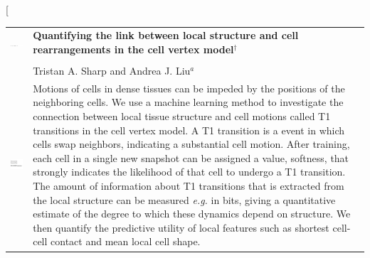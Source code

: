 \documentclass[twoside,twocolumn,9pt]{article}
\begin{document}
\twocolumn[
  \begin{@twocolumnfalse}
\vspace{3cm}
\sffamily
\begin{tabular}{m{4.5cm} p{13.5cm} }

\includegraphics{head_foot/DOI} & \noindent\LARGE{\textbf{
Quantifying the link between local structure and cell rearrangements in the cell vertex model$^\dag$}} \\
\vspace{0.3cm} & \vspace{0.3cm} \\

 & \noindent\large{Tristan A. Sharp and Andrea J. Liu\textit{$^{a}$}} \\%

\includegraphics{head_foot/dates} & \noindent\normalsize{


Motions of cells in dense tissues can be impeded by the positions of the neighboring cells.
We use a machine learning method to investigate 
the connection between local tissue structure and cell motions called T1 transitions in the cell vertex model.
A T1 transition is a event in which cells swap neighbors, indicating a substantial cell motion.
After training, each cell in a single new snapshot can be assigned a value, softness, that strongly indicates the 
likelihood of that cell to undergo a T1 transition.
The amount of information about T1 transitions that is extracted from the local structure can be measured \emph{e.g.} in bits, giving a quantitative estimate of the degree to which these dynamics depend on structure.
We then quantify the predictive utility of local features such as shortest cell-cell contact and mean local cell shape.
} \\ 
\end{tabular}

 \end{@twocolumnfalse} \vspace{0.6cm}
\end{document}
